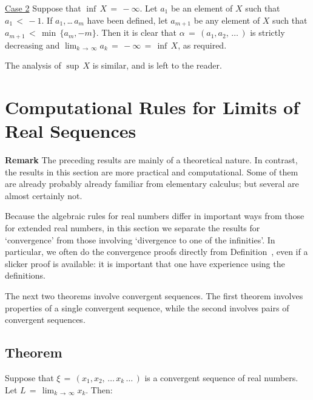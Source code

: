         \underline{Case 2} Suppose that ${\inf}\,X \,=\, -{\infty}$.
    Let $a_{1}$ be an element of $X$ such that $a_{1}\,<\,-1$.
    If $a_{1}$,\,{\ldots}\,$a_{m}$ have been defined, let $a_{m+1}$ be any element of $X$ such that $a_{m+1}\,<\,\min\,\{a_{m},-m\}$.
    Then it is clear that ${\alpha} \,=\, (a_{1},a_{2},\,{\ldots}\,)$ is strictly decreasing and $\lim_{k \,{\rightarrow}\, {\infty}} a_{k} \,=\, -{\infty} \,=\, {\inf}\,X$, as required.

        The analysis of ${\sup}\,X$ is similar, and is left to the reader.

\VV



                \section{{\bf Computational Rules for Limits of Real Sequences}}
                \label{SectC60}


        {\bf Remark} The preceding results are mainly of a theoretical nature. In contrast,  the results in this section are more practical and computational.
    Some of them are already probably already familiar from elementary calculus; but several are almost certainly not.

        Because the algebraic rules for real numbers differ in important ways from those for extended real numbers,
    in this section we separate the results for `convergence' from those involving `divergence to one of the infinities'.
    In particular, we often do the convergence proofs directly from Definition~, even if a slicker proof is available:
    it is important that one have experience using the definitions.

\V

        The next two theorems involve convergent sequences. The first theorem involves properties of a single convergent sequence,
    while the second involves pairs of convergent sequences.

\VV

            \subsection{\small{\bf Theorem}}
            \label{ThmC60.10}

        Suppose that ${\xi} \,=\, (x_{1},x_{2},\,{\ldots}\,x_{k}\,{\ldots}\,)$ is a convergent sequence of real numbers.
    Let $L \,=\, \lim_{k \,{\rightarrow}\, {\infty}} x_{k}$. Then:


